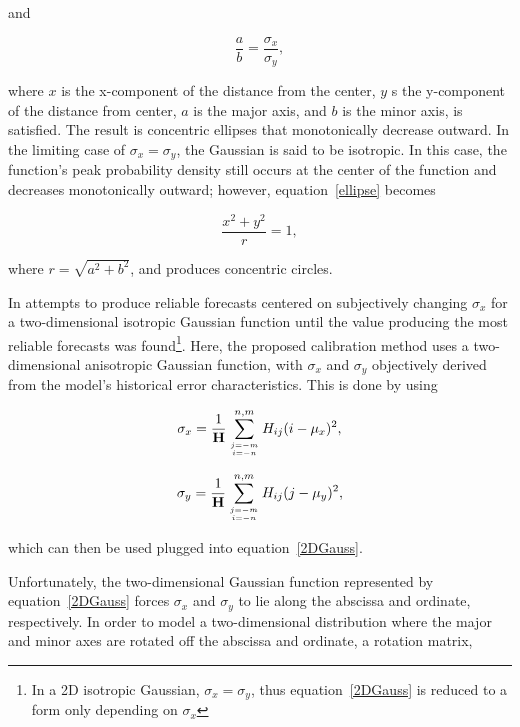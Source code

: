\noindent and

    \begin{equation}
        \frac{a}{b} = \frac{\sigma_x}{\sigma_y},
    \end{equation}

\noindent where $x$ is the x-component of the distance from the center, $y$ s the y-component of the distance from center, $a$ is the major axis, and $b$ is the minor axis, is satisfied. The result is concentric ellipses that monotonically decrease outward. In the limiting case of $\sigma_x = \sigma_y$, the Gaussian is said to be isotropic. In this case, the function's peak probability density still occurs at the center of the function and decreases monotonically outward; however, \mbox{equation \ref{ellipse}} becomes

    \begin{equation*}
        \frac{x^2 + y^2}{r} = 1,
    \end{equation*}

\noindent where $r = \sqrt{a^2 + b^2}$, and produces concentric circles.

In \cite{Sobash2011} attempts to produce reliable forecasts centered on subjectively changing $\sigma_x$ for a two-dimensional isotropic Gaussian function until the value producing the most reliable forecasts was found\footnote{In a 2D isotropic Gaussian, $\sigma_x = \sigma_y$, thus \mbox{equation \ref{2DGauss}} is reduced to a form only depending on $\sigma_x$}. Here, the proposed calibration method uses a two-dimensional anisotropic Gaussian function, with $\sigma_x$ and $\sigma_y$ objectively derived from the model's historical error characteristics. This is done by using

    \begin{equation}
        \label{sigmax}
        \sigma_x = \frac{1}{\mathbf{H}} \sum\limits_{j=-m \atop i=-n}^{n,m}H_{ij}(i - \mu_x)^2,
    \end{equation}

    \begin{equation}
        \label{sigmay}
        \sigma_y = \frac{1}{\mathbf{H}} \sum\limits_{j=-m \atop i=-n}^{n,m}H_{ij}(j - \mu_y)^2,
    \end{equation}

\noindent which can then be used plugged into \mbox{equation \ref{2DGauss}}.

Unfortunately, the two-dimensional Gaussian function represented by \mbox{equation \ref{2DGauss}} forces $\sigma_x$ and $\sigma_y$ to lie along the abscissa and ordinate, respectively. In order to model a two-dimensional distribution where the major and minor axes are rotated off the abscissa and ordinate, a rotation matrix,

